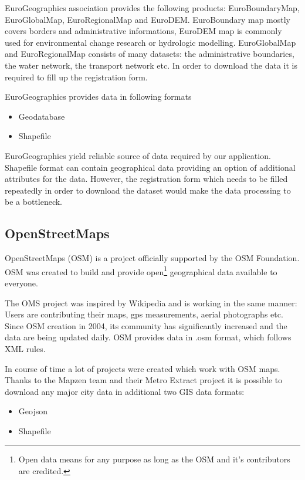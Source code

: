 \documentclass[thesis=M,english]{FITthesis}[2012/10/20]
\begin{document}
EuroGeographics association provides the following products: EuroBoundaryMap, EuroGlobalMap, EuroRegionalMap and EuroDEM.
EuroBoundary map mostly covers borders and administrative informations, EuroDEM map is commonly used for environmental change research or hydrologic modelling.
EuroGlobalMap and EuroRegionalMap consists of many datasets: the administrative boundaries, the water network, the transport network etc. 
In order to download the data it is required to fill up the registration form.

EuroGeographics provides data in following formats

\begin{itemize}
\item Geodatabase
\item Shapefile
\end{itemize}

EuroGeographics yield reliable source of data required by our application. Shapefile format can contain geographical data providing an option of additional attributes for the data. However, the registration form which needs to be filled repeatedly in order to download the dataset would make the data processing to be a bottleneck.

\subsection{OpenStreetMaps}
\label{subsec:DA_OSM}
OpenStreetMaps (OSM) is a project officially supported by the OSM Foundation.
OSM was created to build and provide open\footnote{Open data means for any purpose as long as the OSM and it's contributors are credited.} geographical data available to everyone.  

The OMS project was inspired by Wikipedia and is working in the same manner: Users are contributing their maps, gps measurements, aerial photographs etc. Since OSM creation in 2004, its community has significantly increased and the data are being updated daily.
OSM provides data in .osm format, which follows XML rules.

In course of time a lot of projects were created which work with OSM maps.
Thanks to the Mapzen team and their Metro Extract project it is possible to download any major city data in additional two GIS data formats:
\begin{itemize}
\item Geojson
\item Shapefile
\end{itemize}
\end{document}

